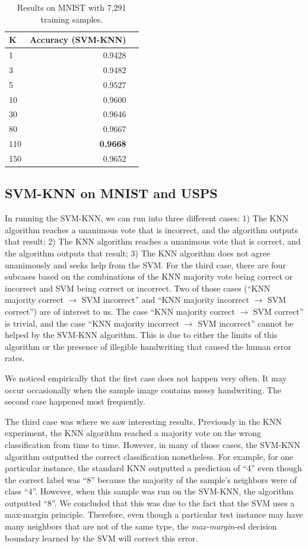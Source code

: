 \documentclass[11pt,letterpaper]{article}
\begin{document}
\begin{table}
\begin{center}
\begin{tabular}{|l|r|r|}
\hline \bf K & \bf Accuracy (SVM-KNN) \\ \hline
1 & 0.9428 \\
3 & 0.9482 \\
5 & 0.9527 \\
10 & 0.9600 \\
30 & 0.9646 \\
80 & 0.9667 \\
110 & \textbf{0.9668} \\
150 & 0.9652 \\
\hline
\end{tabular}
\end{center}
\caption{\label{knn-mnist} Results on MNIST with 7,291 training samples. }
\end{table}

\subsection{SVM-KNN on MNIST and USPS}

In running the SVM-KNN, we can run into three different cases: 1) The KNN algorithm reaches a unanimous vote that is incorrect, and the algorithm outputs that result; 2) The KNN algorithm reaches a unanimous vote that is correct, and the algorithm outputs that result; 3) The KNN algorithm does not agree unanimously and seeks help from the SVM. For the third case, there are four subcases based on the combinations of the KNN majority vote being correct or incorrect and SVM being correct or incorrect. Two of those cases (``KNN majority correct $\rightarrow$ SVM incorrect'' and ``KNN majority incorrect $\rightarrow$ SVM correct'') are of interest to us. The case ``KNN majority correct $\rightarrow$ SVM correct'' is trivial, and the case ``KNN majority incorrect $\rightarrow$ SVM incorrect'' cannot be helped by the SVM-KNN algorithm. This is due to either the limits of this algorithm or the presence of illegible handwriting that caused the human error rates.

We noticed empirically that the first case does not happen very often. It may occur occasionally when the sample image contains messy handwriting. The second case happened most frequently.

The third case was where we saw interesting results. Previously in the KNN experiment, the KNN algorithm reached a majority vote on the wrong classification from time to time. However, in many of those cases, the SVM-KNN algorithm outputted the correct classification nonetheless. For example, for one particular instance, the standard KNN outputted a prediction of ``4'' even though the correct label was ``8'' because the majority of the sample's neighbors were of class ``4''. However, when this sample was run on the SVM-KNN, the algorithm outputted ``8''. We concluded that this was due to the fact that the SVM uses a max-margin principle. Therefore, even though a particular test instance may have many neighbors that are not of the same type, the \textit{max-margin}-ed decision boundary learned by the SVM will correct this error.
\end{document}

